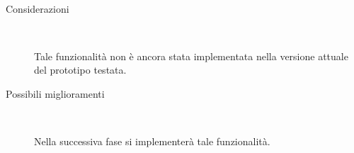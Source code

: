 \documentclass[../../SperimentazioniPratiche.tex]{subfiles}
\begin{document}
\begin{tcolorbox}[fonttitle=\bfseries, 
								adjusted title={\Large Prova 2A.1}, 
								breakable, 
								sharp corners=south,
								colback=white, 
								colframe=white!60!black]
\begin{description}[leftmargin=0.7cm,labelwidth=!]
\begin{description}
        				\end{description}
        				
        			\tcbline
        			
        			\item[Analisi risultati] \ \par
        				\begin{description}
        					\item[Considerazioni] \ \par
        						Tale funzionalità non è ancora stata implementata nella versione attuale del prototipo testata.
        					
        					\item[Possibili miglioramenti] \ \par 
        						Nella successiva fase si implementerà tale funzionalità.
        				\end{description}
        				
				\end{description}  
				
			\end{tcolorbox}



	
	\newpage
\end{document}
